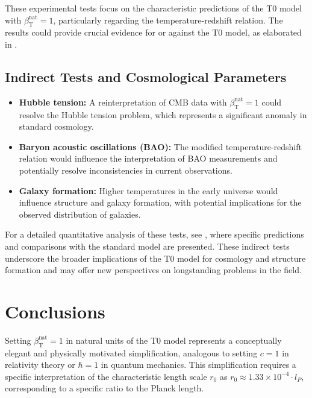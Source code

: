 \documentclass[12pt,a4paper]{article}
\newcommand{\betaT}{\beta_{\text{T}}}
\begin{document}
	These experimental tests focus on the characteristic predictions of the T0 model with \(\betaT^{\text{nat}} = 1\), particularly regarding the temperature-redshift relation. The results could provide crucial evidence for or against the T0 model, as elaborated in \cite{pascher_messdifferenzen_2025}.
	
	\subsection{Indirect Tests and Cosmological Parameters}
	\label{subsec:indirect_tests}
	
	\begin{itemize}
		\item \textbf{Hubble tension:} A reinterpretation of CMB data with \(\betaT^{\text{nat}} = 1\) could resolve the Hubble tension problem, which represents a significant anomaly in standard cosmology.
		\item \textbf{Baryon acoustic oscillations (BAO):} The modified temperature-redshift relation would influence the interpretation of BAO measurements and potentially resolve inconsistencies in current observations.
		\item \textbf{Galaxy formation:} Higher temperatures in the early universe would influence structure and galaxy formation, with potential implications for the observed distribution of galaxies.
	\end{itemize}
	
	For a detailed quantitative analysis of these tests, see \cite{pascher_alphabeta_2025}, where specific predictions and comparisons with the standard model are presented. These indirect tests underscore the broader implications of the T0 model for cosmology and structure formation and may offer new perspectives on longstanding problems in the field.
	
	\section{Conclusions}
	\label{sec:conclusions}
	
	Setting \(\betaT^{\text{nat}} = 1\) in natural units of the T0 model represents a conceptually elegant and physically motivated simplification, analogous to setting \(c = 1\) in relativity theory or \(\hbar = 1\) in quantum mechanics. This simplification requires a specific interpretation of the characteristic length scale \(r_0\) as \(r_0 \approx 1.33 \times 10^{-4} \cdot l_P\), corresponding to a specific ratio to the Planck length.
	
\end{document}
